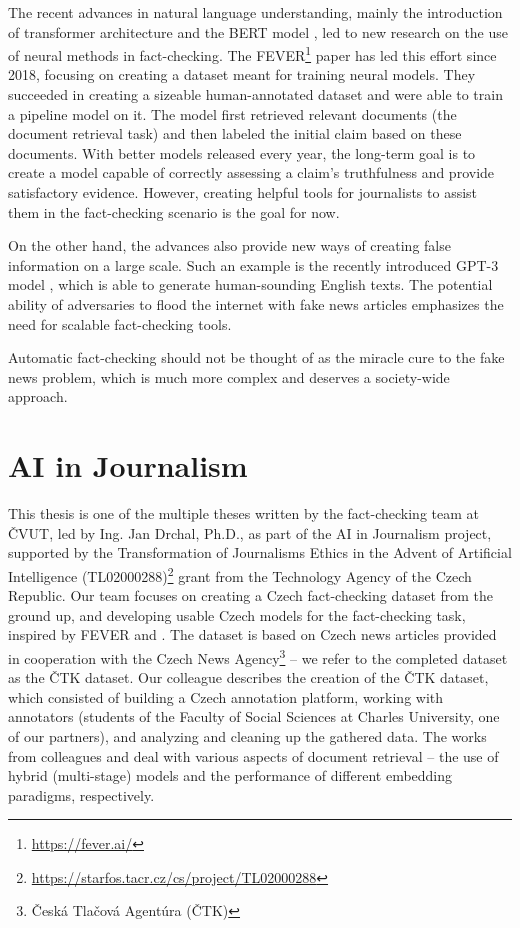 The recent advances in natural language understanding, mainly the introduction of transformer architecture \citep{attention-is-all-you-need} and the BERT model \citep{bert}, led to new research on the use of neural methods in fact-checking.
The FEVER\footnote{\url{https://fever.ai/}} paper \citep{fever} has led this effort since 2018, focusing on creating a dataset meant for training neural models.
They succeeded in creating a sizeable human-annotated dataset and were able to train a pipeline model on it.
The model first retrieved relevant documents (the document retrieval task) and then labeled the initial claim based on these documents. 
With better models released every year, the long-term goal is to create a model capable of correctly assessing a claim's truthfulness and provide satisfactory evidence. However, creating helpful tools for journalists to assist them in the fact-checking scenario is the goal for now.

On the other hand, the advances also provide new ways of creating false information on a large scale. Such an example is the recently introduced GPT-3 model \citep{gpt}, which is able to generate human-sounding English texts.
The potential ability of adversaries to flood the internet with fake news articles emphasizes the need for scalable fact-checking tools.

Automatic fact-checking should not be thought of as the miracle cure to the fake news problem, which is much more complex and deserves a society-wide approach.

\section*{AI in Journalism}

This thesis is one of the multiple theses written by the fact-checking team at ČVUT, led by Ing. Jan Drchal, Ph.D., as part of the AI in Journalism project, supported by the Transformation of Journalisms Ethics in the Advent of Artificial Intelligence (TL02000288)\footnote{\url{https://starfos.tacr.cz/cs/project/TL02000288}} grant from the Technology Agency of the Czech Republic.
Our team focuses on creating a Czech fact-checking dataset from the ground up, and developing usable Czech models for the fact-checking task, inspired by FEVER \citep{fever} and \citet{danish_fever}.
The dataset is based on Czech news articles provided in cooperation with the Czech News Agency\footnote{Česká Tlačová Agentúra (ČTK)} -- we refer to the completed dataset as the ČTK dataset. 
Our colleague \citet{ullrich} describes the creation of the ČTK dataset, which consisted of building a Czech annotation platform, working with annotators (students of the Faculty of Social Sciences at Charles University, one of our partners), and analyzing and cleaning up the gathered data.
The works from colleagues \citet{dedkova} and \citet{rypar} deal with various aspects of document retrieval -- the use of hybrid (multi-stage) models and the performance of different embedding paradigms, respectively.

